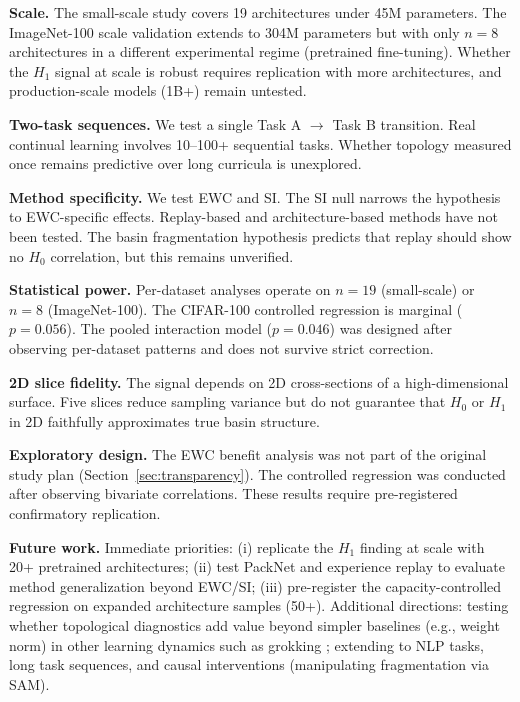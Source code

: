 \documentclass{article}
\begin{document}
\textbf{Scale.} The small-scale study covers 19 architectures under 45M parameters. The ImageNet-100 scale validation extends to 304M parameters but with only $n = 8$ architectures in a different experimental regime (pretrained fine-tuning). Whether the $H_1$ signal at scale is robust requires replication with more architectures, and production-scale models (1B+) remain untested.

\textbf{Two-task sequences.} We test a single Task A $\rightarrow$ Task B transition. Real continual learning involves 10--100+ sequential tasks. Whether topology measured once remains predictive over long curricula is unexplored.

\textbf{Method specificity.} We test EWC and SI. The SI null narrows the hypothesis to EWC-specific effects. Replay-based and architecture-based methods have not been tested. The basin fragmentation hypothesis predicts that replay should show no $H_0$ correlation, but this remains unverified.

\textbf{Statistical power.} Per-dataset analyses operate on $n = 19$ (small-scale) or $n = 8$ (ImageNet-100). The CIFAR-100 controlled regression is marginal ($p = 0.056$). The pooled interaction model ($p = 0.046$) was designed after observing per-dataset patterns and does not survive strict correction.

\textbf{2D slice fidelity.} The signal depends on 2D cross-sections of a high-dimensional surface. Five slices reduce sampling variance but do not guarantee that $H_0$ or $H_1$ in 2D faithfully approximates true basin structure.

\textbf{Exploratory design.} The EWC benefit analysis was not part of the original study plan (Section~\ref{sec:transparency}). The controlled regression was conducted after observing bivariate correlations. These results require pre-registered confirmatory replication.

\textbf{Future work.} Immediate priorities: (i) replicate the $H_1$ finding at scale with 20+ pretrained architectures; (ii) test PackNet and experience replay to evaluate method generalization beyond EWC/SI; (iii) pre-register the capacity-controlled regression on expanded architecture samples (50+). Additional directions: testing whether topological diagnostics add value beyond simpler baselines (e.g., weight norm) in other learning dynamics such as grokking \citep{power2022grokking}; extending to NLP tasks, long task sequences, and causal interventions (manipulating fragmentation via SAM).
\end{document}
